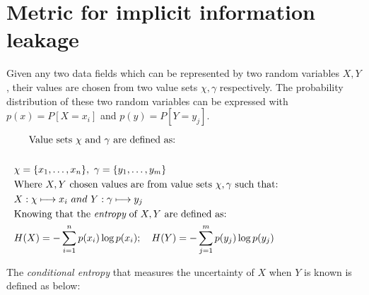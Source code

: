 \section{Metric for implicit information leakage} 
\label{app:infoTheoritic}
Given any two data fields which can be represented by two random variables $X,Y$, their values are chosen from two value sets $\chi, \gamma$ respectively. The probability distribution of these two random variables can be expressed with $p\left( x \right)=P \left[ X=x_i\right]$ and $p\left( y \right)=P\left[Y=y_j\right]$. 

\begin{equation}
\label{equ:Leakagedefinition}
\begin{aligned}
\noalign{\text{Value sets $\chi$ and $\gamma$ are defined as:}}\\
&\chi=\{x_1,\ldots,x_n\}, ~ \gamma=\{y_1,\ldots,y_m\}\\
&\text{Where $X,Y$ chosen values are from value sets $\chi, \gamma$ such that:}\\
&X: \chi \longmapsto x_i ~and~  Y:\gamma \longmapsto y_j\\
&\text{Knowing that the {\it entropy} of $X,Y$ are defined as:} \\
&H(X) = -\sum_{i=1}^{n}p(x_i) \log p(x_i); \quad
H(Y) = -\sum_{j=1}^{m}p(y_j) \log p(y_j)\\
\end{aligned}
\end{equation}

The {\it conditional entropy} that measures the uncertainty of $X$ when $Y$ is known is defined as below: 

